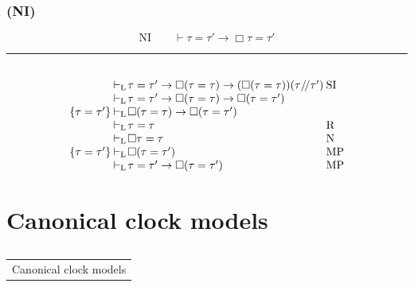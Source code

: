 \documentclass[xcolor=x11names]{beamer}
\makeatletter
\let\beamer@writeslidentry@miniframeson=\beamer@writeslidentry
\def\beamer@writeslidentry@miniframesoff{%
  \expandafter\beamer@ifempty\expandafter{\beamer@framestartpage}{}%
  {%
    \clearpage\beamer@notesactions%
  }
}
\newcommand*{\miniframeson}{\let\beamer@writeslidentry=\beamer@writeslidentry@miniframeson}
\newcommand*{\miniframesoff}{\let\beamer@writeslidentry=\beamer@writeslidentry@miniframesoff}
\newcommand{\cimdia}[1] {\miniframesoff \begin{frame}\begin{center}\huge \begin{tabular}{c}#1\end{tabular}\end{center}\end{frame}\miniframeson}
\newcommand{\szakasz}[2][]{\section{#1}\subsection{}\cimdia{#2}}
\newcommand{\lthen}{\rightarrow}
\newcommand{\derives}[1][]{\vdash_{\mathrm{#1}}}
\makeatother
\begin{document}
\begin{frame}[t]
\frametitle{(NI)}
\footnotesize

\[ \mathrm{NI}  \qquad \vdash \tau=\tau' \lthen \Box \tau=\tau'\]
\hrule
\bigskip

\[ \arraycolsep=.2mm
\begin{array}{rrclll}
\\ &&\derives[L]&   \tau=\tau'\lthen \Box (\tau= \tau )\lthen (\Box (\tau= \tau ))(\tau/\!/\tau')
     &&\textup{SI}
\\ &&\derives[L]&   \tau=\tau'\lthen \Box (\tau= \tau )\lthen \Box (\tau= \tau' )
     &&\textup{}
\\ \{\tau=\tau'\} &&\derives[L]&   \Box (\tau= \tau )\lthen \Box (\tau= \tau' )
     &&\textup{}
\\ &&\derives[L]&   \tau= \tau
     &&\textup{R}
\\ &&\derives[L]&   \Box \tau= \tau
     &&\textup{N}
\\ \{\tau=\tau'\} &&\derives[L]&   \Box (\tau= \tau' )
     &&\textup{MP}
\\  &&\derives[L]&   \tau=\tau' \lthen \Box (\tau= \tau' )
     &&\textup{MP}
\end{array}
\]
\end{frame}

\szakasz[Canonical clock models]{Canonical clock models}
\end{document}
